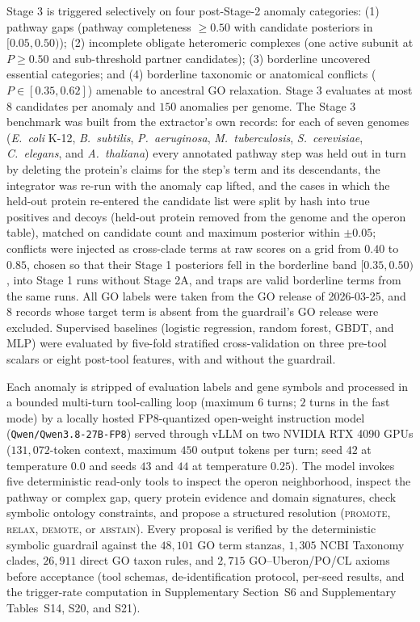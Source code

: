 \documentclass[10pt,twocolumn]{article}
\begin{document}
Stage 3 is triggered selectively on four post-Stage-2 anomaly categories: (1) pathway gaps (pathway completeness $\ge 0.50$ with candidate posteriors in $[0.05, 0.50)$); (2) incomplete obligate heteromeric complexes (one active subunit at $P \ge 0.50$ and sub-threshold partner candidates); (3) borderline uncovered essential categories; and (4) borderline taxonomic or anatomical conflicts ($P \in [0.35, 0.62]$) amenable to ancestral GO relaxation. Stage 3 evaluates at most $8$ candidates per anomaly and $150$ anomalies per genome. The Stage 3 benchmark was built from the extractor's own records: for each of seven genomes (\textit{E.~coli} K-12, \textit{B.~subtilis}, \textit{P.~aeruginosa}, \textit{M.~tuberculosis}, \textit{S.~cerevisiae}, \textit{C.~elegans}, and \textit{A.~thaliana}) every annotated pathway step was held out in turn by deleting the protein's claims for the step's term and its descendants, the integrator was re-run with the anomaly cap lifted, and the cases in which the held-out protein re-entered the candidate list were split by hash into true positives and decoys (held-out protein removed from the genome and the operon table), matched on candidate count and maximum posterior within $\pm 0.05$; conflicts were injected as cross-clade terms at raw scores on a grid from $0.40$ to $0.85$, chosen so that their Stage 1 posteriors fell in the borderline band $[0.35, 0.50)$, into Stage 1 runs without Stage 2A, and traps are valid borderline terms from the same runs. All GO labels were taken from the GO release of 2026-03-25, and $8$ records whose target term is absent from the guardrail's GO release were excluded. Supervised baselines (logistic regression, random forest, GBDT, and MLP) were evaluated by five-fold stratified cross-validation on three pre-tool scalars or eight post-tool features, with and without the guardrail.

Each anomaly is stripped of evaluation labels and gene symbols and processed in a bounded multi-turn tool-calling loop (maximum $6$ turns; $2$ turns in the fast mode) by a locally hosted FP8-quantized open-weight instruction model (\texttt{Qwen/Qwen3.8-27B-FP8}) served through vLLM on two NVIDIA RTX 4090 GPUs ($131{,}072$-token context, maximum $450$ output tokens per turn; seed $42$ at temperature $0.0$ and seeds $43$ and $44$ at temperature $0.25$). The model invokes five deterministic read-only tools to inspect the operon neighborhood, inspect the pathway or complex gap, query protein evidence and domain signatures, check symbolic ontology constraints, and propose a structured resolution (\textsc{promote}, \textsc{relax}, \textsc{demote}, or \textsc{abstain}). Every proposal is verified by the deterministic symbolic guardrail against the $48{,}101$ GO term stanzas, $1{,}305$ NCBI Taxonomy clades, $26{,}911$ direct GO taxon rules, and $2{,}715$ GO--Uberon/PO/CL axioms before acceptance (tool schemas, de-identification protocol, per-seed results, and the trigger-rate computation in Supplementary Section~S6 and Supplementary Tables~S14, S20, and S21).
\end{document}
